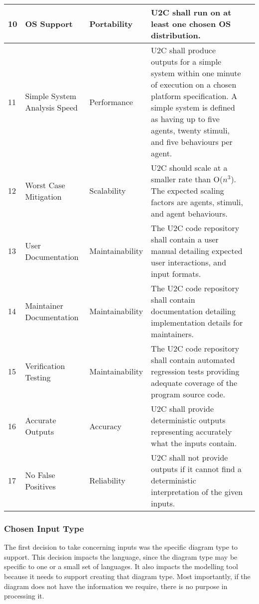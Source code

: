 \begin{longtable}{|l|p{2.6cm}|l|p{4.5cm}|c|}
    \hline
    10 & OS Support & Portability & U2C shall run on at least one chosen OS distribution. & \cellcolor{green!30}  \\
    \hline
    11 & Simple System Analysis Speed & Performance & U2C shall produce outputs for a simple system within one minute of execution on a chosen platform specification.
    A simple system is defined as having up to five agents, twenty stimuli, and five behaviours per agent. & \cellcolor{gray!30}  \\
    \hline
    12 & Worst Case Mitigation & Scalability & U2C should scale at a smaller rate than O($n^3$). The expected scaling factors are agents, stimuli, and agent behaviours. & \cellcolor{gray!30}  \\
    \hline
    13 & User Documentation & Maintainability & The U2C code repository shall contain a user manual detailing expected user interactions, and input formats. & \cellcolor{gray!30}  \\
    \hline
    14 & Maintainer Documentation & Maintainability & The U2C code repository shall contain documentation detailing implementation details for maintainers. & \cellcolor{green!30}  \\
    \hline
    15 & Verification Testing & Maintainability & The U2C code repository shall contain automated regression tests providing adequate coverage of the program source code. & \cellcolor{green!30}  \\
    \hline
    16 & Accurate Outputs & Accuracy & U2C shall provide deterministic outputs representing accurately what the inputs contain. & \cellcolor{green!30}  \\
    \hline
    17 & No False Positives & Reliability & U2C shall not provide outputs if it cannot find a deterministic interpretation of the given inputs. & \cellcolor{gray!30}  \\
    \hline
\end{longtable}

\subsubsection{Chosen Input Type}
The first decision to take concerning inputs was the specific diagram type to support.
This decision impacts the language, since the diagram type may be specific to one or a small set of languages.
It also impacts the modelling tool because it needs to support creating that diagram type.
Most importantly, if the diagram does not have the information we require, there is no purpose in processing it.

